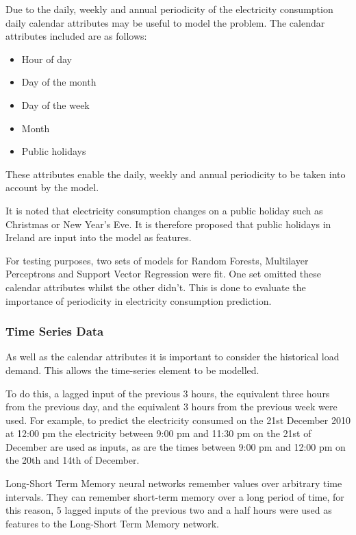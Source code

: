 Due to the daily, weekly and annual periodicity of the electricity consumption daily calendar attributes may be useful to model the problem. The calendar attributes included are as follows:

\begin{itemize}
	\item Hour of day
	\item Day of the month
	\item Day of the week
	\item Month
	\item Public holidays
\end{itemize}

These attributes enable the daily, weekly and annual periodicity to be taken into account by the model.

It is noted that electricity consumption changes on a public holiday such as Christmas or New Year's Eve. It is therefore proposed that public holidays in Ireland are input into the model as features. 

For testing purposes, two sets of models for Random Forests, Multilayer Perceptrons and Support Vector Regression were fit. One set omitted these calendar attributes whilst the other didn't. This is done to evaluate the importance of periodicity in electricity consumption prediction.

\subsubsection{Time Series Data}

As well as the calendar attributes it is important to consider the historical load demand. This allows the time-series element to be modelled.  

To do this, a lagged input of the previous 3 hours, the equivalent three hours from the previous day, and the equivalent 3 hours from the previous week were used. For example, to predict the electricity consumed on the 21st December 2010 at 12:00 pm the electricity between 9:00 pm and 11:30 pm on the 21st of December are used as inputs, as are the times between 9:00 pm and 12:00 pm on the 20th and 14th of December.

Long-Short Term Memory neural networks remember values over arbitrary time intervals. They can remember short-term memory over a long period of time, for this reason, 5 lagged inputs of the previous two and a half hours were used as features to the Long-Short Term Memory network.

